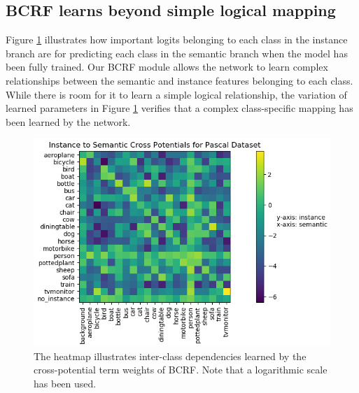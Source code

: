 \subsection{BCRF learns beyond simple logical mapping}
Figure \ref{fig:potentials} illustrates how important logits belonging to each class in the instance branch are for predicting each class in the semantic branch when the model has been fully trained. Our BCRF module allows the network to learn complex relationships between the semantic and instance features belonging to each class. While there is room for it to learn a simple logical relationship, the variation of learned parameters in Figure \ref{fig:potentials} verifies that a complex class-specific mapping has been learned by the network. 

\begin{figure}[t]
	\begin{center}
		\includegraphics[width=0.8\linewidth]{figs/ins_to_sem.png}
	\end{center}
	\vspace{-0.4cm}
	\caption[Bipartite Potentials Visualization]{The heatmap illustrates inter-class dependencies learned by the cross-potential term weights of BCRF. Note that a logarithmic scale has been used. }
	\label{fig:potentials}
	\vspace{0.5cm}
\end{figure}